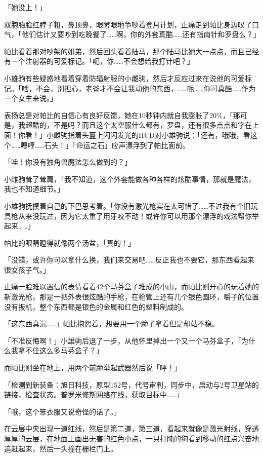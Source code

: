 「她没上！」

双胞胎脸红脖子粗，鼻顶鼻，眼瞪眼地争吵着登月计划，止痛走到帕比身边叹了口气，「他们估计又要吵到吃晚餐了……啊，你的外套真酷……还有指南针和罗盘么？」

帕比看着那对吵架的姐弟，然后回头看着陆马，那个陆马比她大一点点，而且已经有一个注射器的可爱标记。「呃，你……不会想给我打针吧？」

小雄驹有些疑惑地看着穿着防辐射服的小雌驹，然后才反应过来在说他的可爱标记。「啥，不会，别担心，老爸才不会让我动他的东西，……呃……你可真酷……作为一个女生来说。」

表扬总是对帕比的自信心有良好反馈，她在10秒钟内就自我膨胀了20\%，「那可是，我超酷的，不是吗？而且这个太空服什么都有，罗盘，还有很多点点和字在上面！你看！」小雌驹指着头盔上闪闪发光的HUD对小雄驹说：「还有，哦哦，看这个……嗯哼……石头！」「命运之石」应声漂浮到了帕比面前。

「哇！你没有独角兽魔法怎么做到的？」

小雌驹耸了耸肩，「我不知道，这个外套能做各种各样的炫酷事情，那就是魔法，我也不知道细节。」

小雄驹抚摸着自己的下巴思考着。「你没有激光枪实在太可惜了……不过我有个旧玩具枪从来没玩过，因为它太重了用牙咬不动！或许你可以用那个漂浮的戏法帮你举起来……」

帕比的眼睛瞪得就像两个汤盆，「真的！」

「没错，或许你可以拿什么换，我们来交易吧……反正我也不要它，那东西看起来很女孩子气。」

\horizonline


止痛一脸难以置信的表情看着42个马芬盒子堆成的小山，而帕比则开心的玩着她的新激光枪，那是一把外表很炫酷的手枪，在枪管上还有几个银色圆环，嚼子的位置没有扳机，整个东西都是银色的金属和红色的塑料制成的。

「这东西真沉……」帕比抱怨着，想要用一个蹄子拿着但是却站不稳。

「不准反悔啊！」小雄驹后退了一步，从他怀里掉出一个又一个马芬盒子，「为什么我拿不住这么多马芬盒子？」

而帕比则坐在地上，用两个前蹄举起武器然后说「呯！」

「{\mt 检测到新装备：旭日科技，原型152号，代号审判，同步中，启动与2号卫星站的链接，检查状态。普罗米修斯网络在线，获取目标中……}」

「哦，这个笨衣服又说奇怪的话了。」

在云层中央出现一道红线，然后是第二道，第三道，看起来就像是激光射线，穿透厚厚的云层，在地面上画出无害的红色小点，一只打盹的狗看到移动的红点兴奋地追赶起来，然后一头撞在栅栏门上。


